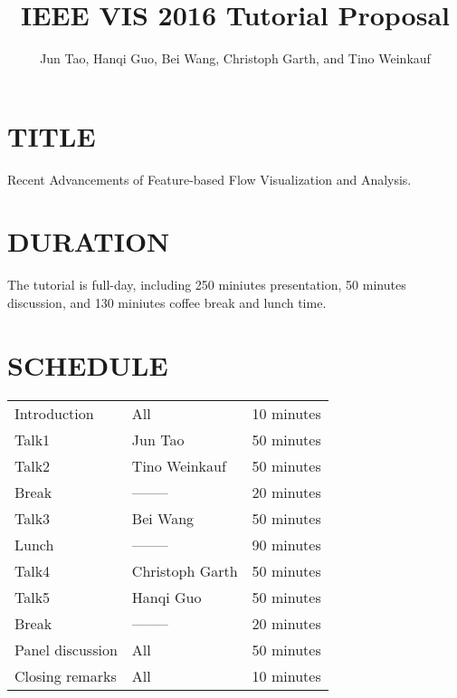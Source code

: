 \documentclass[preprint,journal]{vgtc}       %
\title{IEEE VIS 2016 Tutorial Proposal}
\author{Jun Tao, Hanqi Guo, Bei Wang, Christoph Garth, and Tino Weinkauf}
\begin{document}


\maketitle

\section*{TITLE}
Recent Advancements of Feature-based Flow Visualization and Analysis.

\section*{DURATION}
The tutorial is full-day, including 250 miniutes presentation, 50 minutes discussion, and 130 miniutes coffee break and lunch time.

\section*{SCHEDULE}

\vspace{-0.1in}
\begin{table}[H]
\begin{tabular}{lll}
Introduction & All & 10 minutes\\
Talk1 & Jun Tao & 50 minutes\\
Talk2 & Tino Weinkauf & 50 minutes\\
Break & -------- & 20 minutes\\
Talk3 & Bei Wang & 50 minutes\\
Lunch & -------- & 90 minutes\\
Talk4 & Christoph Garth & 50 minutes\\
Talk5 & Hanqi Guo & 50 minutes\\
Break & -------- & 20 minutes\\
Panel discussion & All & 50 minutes\\
Closing remarks & All & 10 minutes
\end{tabular}
\end{table}
\end{document}
